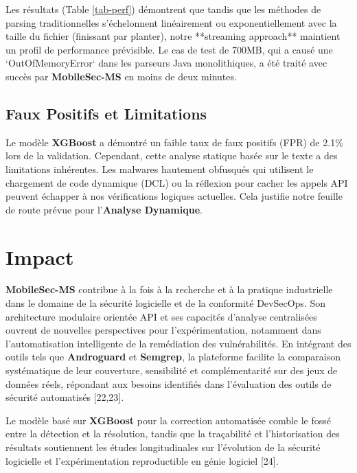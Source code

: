 \documentclass[
  journal=largetwo,
  manuscript=article-type,
  year=2025,
  volume=1,
]{cup-journal}
\begin{document}
Les résultats (Table \ref{tab-perf}) démontrent que tandis que les méthodes de parsing traditionnelles s'échelonnent linéairement ou exponentiellement avec la taille du fichier (finissant par planter), notre **streaming approach** maintient un profil de performance prévisible. Le cas de test de 700MB, qui a causé une `OutOfMemoryError` dans les parseurs Java monolithiques, a été traité avec succès par \textbf{MobileSec-MS} en moins de deux minutes.

\subsection{Faux Positifs et Limitations}
Le modèle \textbf{XGBoost} a démontré un faible taux de faux positifs (FPR) de 2.1\% lors de la validation. Cependant, cette analyse statique basée sur le texte a des limitations inhérentes. Les malwares hautement obfusqués qui utilisent le chargement de code dynamique (DCL) ou la réflexion pour cacher les appels API peuvent échapper à nos vérifications logiques actuelles. Cela justifie notre feuille de route prévue pour l'\textbf{Analyse Dynamique}.

\section{Impact}
\label{sec-impact}

\textbf{MobileSec-MS} contribue à la fois à la recherche et à la pratique industrielle dans le domaine de la sécurité logicielle et de la conformité DevSecOps. Son architecture modulaire orientée API et ses capacités d'analyse centralisées ouvrent de nouvelles perspectives pour l'expérimentation, notamment dans l'automatisation intelligente de la remédiation des vulnérabilités. En intégrant des outils tels que \textbf{Androguard} et \textbf{Semgrep}, la plateforme facilite la comparaison systématique de leur couverture, sensibilité et complémentarité sur des jeux de données réels, répondant aux besoins identifiés dans l'évaluation des outils de sécurité automatisés [22,23].

Le modèle basé sur \textbf{XGBoost} pour la correction automatisée comble le fossé entre la détection et la résolution, tandis que la traçabilité et l'historisation des résultats soutiennent les études longitudinales sur l'évolution de la sécurité logicielle et l'expérimentation reproductible en génie logiciel [24].
\end{document}
